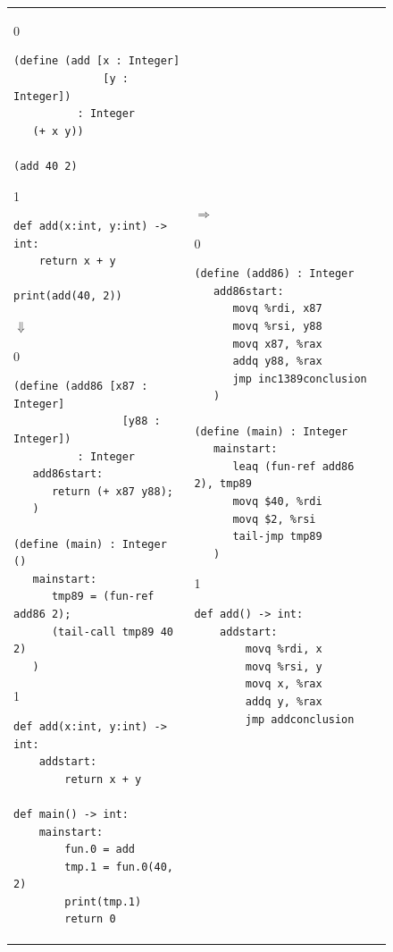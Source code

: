 \documentclass[7x10]{TimesAPriori_MIT}%
\def\racketEd{0}
\def\pythonEd{1}
\def\edition{1}
\newcommand{\pythonColor}[0]{}
\numberwithin{theorem}{chapter}
\numberwithin{definition}{chapter}
\numberwithin{equation}{chapter}
\begin{document}
\begin{figure}[htbp]
  \begin{tcolorbox}[colback=white]
    \begin{tabular}{ll}
\begin{minipage}{0.4\textwidth}
{\if\edition\racketEd
\begin{lstlisting}[basicstyle=\ttfamily\footnotesize]
(define (add [x : Integer]
              [y : Integer])
          : Integer
   (+ x y))

(add 40 2)
\end{lstlisting}
\fi}
{\if\edition\pythonEd\pythonColor
\begin{lstlisting}[basicstyle=\ttfamily\footnotesize]
def add(x:int, y:int) -> int:
    return x + y

print(add(40, 2))
\end{lstlisting}
\fi}
$\Downarrow$
{\if\edition\racketEd
\begin{lstlisting}[basicstyle=\ttfamily\footnotesize]
(define (add86 [x87 : Integer]
                 [y88 : Integer])
          : Integer
   add86start:
      return (+ x87 y88);
   )

(define (main) : Integer ()
   mainstart:
      tmp89 = (fun-ref add86 2);
      (tail-call tmp89 40 2)
   )
\end{lstlisting}
\fi}
{\if\edition\pythonEd\pythonColor
\begin{lstlisting}[basicstyle=\ttfamily\footnotesize]
def add(x:int, y:int) -> int:
    addstart:
        return x + y

def main() -> int:
    mainstart:
        fun.0 = add
        tmp.1 = fun.0(40, 2)
        print(tmp.1)
        return 0
\end{lstlisting}
\fi}
\end{minipage}
&
$\Rightarrow$
\begin{minipage}{0.5\textwidth}
{\if\edition\racketEd
\begin{lstlisting}[basicstyle=\ttfamily\footnotesize]
(define (add86) : Integer
   add86start:
      movq %rdi, x87
      movq %rsi, y88
      movq x87, %rax
      addq y88, %rax
      jmp inc1389conclusion
   )

(define (main) : Integer
   mainstart:
      leaq (fun-ref add86 2), tmp89
      movq $40, %rdi
      movq $2, %rsi
      tail-jmp tmp89
   )
\end{lstlisting}
\fi}
{\if\edition\pythonEd\pythonColor
\begin{lstlisting}[basicstyle=\ttfamily\footnotesize]
def add() -> int:
    addstart:
        movq %rdi, x
        movq %rsi, y
        movq x, %rax
        addq y, %rax
        jmp addconclusion


\end{lstlisting}}
\end{minipage}
\end{tabular}
\end{tcolorbox}
\end{figure}
\end{document}
